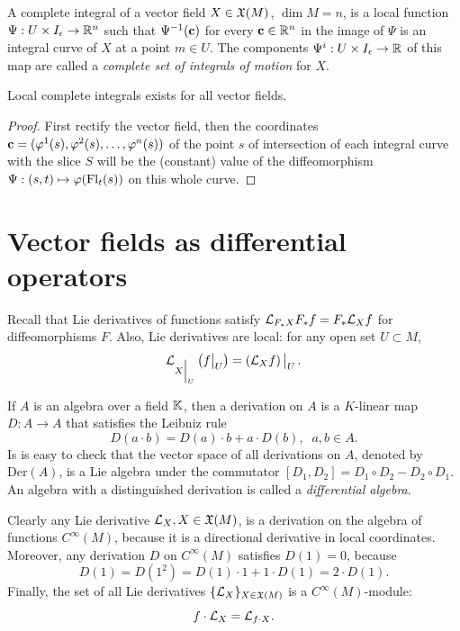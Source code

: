 \begin{defn}\label{def complete integral}
    A complete integral of a vector field $X\in \fX(M)$, $\dim M=n$, is a local function $\Psi:U\times I_\epsilon\to\bbR^n$ such that $\Psi^{-1}(\bf{c})$ for every $\bf{c}\in\bbR^n$ in the image of $\Psi$ is an integral curve of $X$ at a point $m\in U$. The components $\Psi^i:U\times I_\epsilon\to \bbR$ of this map are called a \emph{complete set of integrals of motion} for $X$.
\end{defn}
\begin{prop}
    Local complete integrals exists for all vector fields.
\end{prop}
\begin{proof}
    First rectify the vector field, then the coordinates $\bf{c}=(\varphi^1(s),\varphi^2(s),\ldots,\varphi^n(s))$ of the point $s$ of intersection of each integral curve with the slice $S$ will be the (constant) value of the diffeomorphism $\Psi:(s,t)\mapsto \varphi(\Fl_t(s))$ on this whole curve.
\end{proof}




\section{Vector fields as differential operators}

Recall that Lie derivatives of functions satisfy $\Lie_{F_\ast X}F_\ast f=F_\ast\Lie_X f$ for diffeomorphisms $F$. Also, Lie derivatives are local: for any open set $U\subset M$,
\[\Lie_{\restr{X}{U}}\left(\restr{f}{U}\right)=\restr{\left(\Lie_X f\right)}{U}.\]

\begin{defn}[Derivations]
    If $A$ is an algebra over a field $\bbK$, then a derivation on $A$ is a $K$-linear map $D:A\to A$ that satisfies the Leibniz rule
    \[D(a\cdot b)=D(a)\cdot b+a\cdot D(b),\;\; a,b\in A.\]
    Is is easy to check that the vector space of all derivations on $A$, denoted by $\mathrm{Der}(A)$, is a Lie algebra under the commutator $[D_1,D_2]=D_1\circ D_2-D_2\circ D_1$.
    An algebra with a distinguished derivation is called a \emph{differential algebra}.
\end{defn}

Clearly any Lie derivative $\Lie_X, X\in\fX(M)$, is a derivation on the algebra of functions $C^\infty(M)$, because it is a directional derivative in local coordinates.
Moreover, any derivation $D$ on $C^\infty(M)$ satisfies $D(1)=0$, because
\[D(1)=D(1^2)=D(1)\cdot 1+1\cdot D(1)=2\cdot D(1).\]
Finally, the set of all Lie derivatives $\{\Lie_X\}_{X\in\fX(M)}$ is a $C^\infty(M)$-module:
\[f\cdot\Lie_X=\Lie_{f\cdot X}.\]

